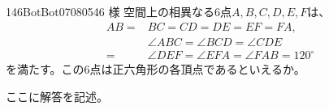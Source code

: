 \begin{prob}{146}{}{BotBot07080546 様}
 空間上の相異なる6点$A, B, C, D, E, F$は、
 \begin{align*}
  AB=&BC=CD=DE=EF=FA, \\
  &\angle{ABC}=\angle{BCD}=\angle{CDE} \\
  =&\angle{DEF}=\angle{EFA}=\angle{FAB}=120^\circ
 \end{align*}
 を満たす。この6点は正六角形の各頂点であるといえるか。
\end{prob}

ここに解答を記述。
